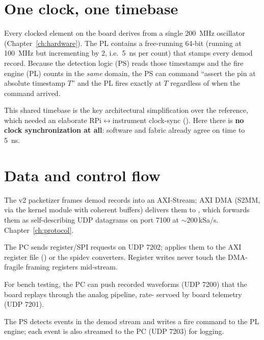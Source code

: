 
\section{One clock, one timebase}
Every clocked element on the board derives from a single \SI{200}{\mega\hertz}
oscillator (Chapter~\ref{ch:hardware}). The PL contains a free-running 64-bit
 (running at \SI{100}{\mega\hertz} but incrementing by 2,
i.e.\ \SI{5}{\nano\second} per count) that stamps every demod record. Because the
detection logic (PS) reads those timestamps and the fire engine (PL) counts in
the \emph{same} domain, the PS can command ``assert the pin at absolute timestamp
$T$'' and the PL fires exactly at $T$ regardless of when the command arrived.

This shared timebase is the key architectural simplification over the reference,
which needed an elaborate RPi$\leftrightarrow$instrument clock-sync
(). Here there is \textbf{no clock synchronization at
all}: software and fabric already agree on time to \SI{5}{\nano\second}.

\section{Data and control flow}
\begin{description}[style=nextline]
  \item[Measurement (PL$\to$PS$\to$PC).] The v2 packetizer frames demod records
    into an AXI-Stream; AXI DMA (S2MM, via the  kernel module
    with coherent buffers) delivers them to , which forwards
    them as self-describing UDP datagrams on port 7100 at ${\sim}200$\,kSa/s.
    Chapter~\ref{ch:protocol}.
  \item[Control (PC$\to$PS$\to$PL).] The PC sends register/SPI requests on UDP
    7202;  applies them to the AXI register file
    () or the spidev converters. Register writes never touch the
    DMA-fragile framing registers mid-stream.
  \item[Replay (PC$\to$PS$\to$PL).] For bench testing, the PC can push recorded
    waveforms (UDP 7200) that the board replays through the analog pipeline, rate-
    servoed by board telemetry (UDP 7201).
  \item[Triggering (PS detect $\to$ PL fire; events PS$\to$PC).] The PS detects
    events in the demod stream and writes a fire command to the PL engine; each
    event is also streamed to the PC (UDP 7203) for logging.
\end{description}

